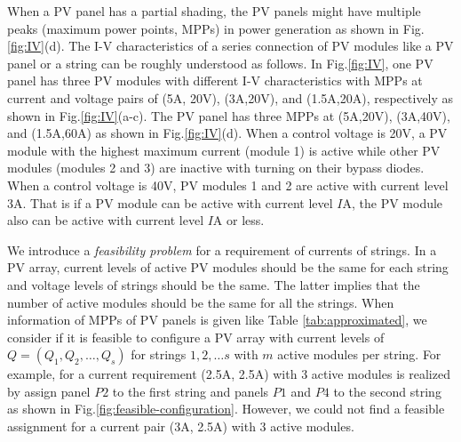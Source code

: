 \documentclass[conference]{IEEEtran}
\begin{document}
When a PV panel has a partial shading, the PV panels might have multiple peaks (maximum power points, MPPs) in power generation as shown in Fig.\ref{fig:IV}(d). 
The I-V characteristics of a series connection of PV modules like a PV panel or a string can be roughly understood as follows. 
In Fig.\ref{fig:IV}, one PV panel has three PV modules with different I-V characteristics with MPPs at current and voltage pairs of (5A, 20V), (3A,20V), and (1.5A,20A), respectively as shown in Fig.\ref{fig:IV}(a-c). The PV panel has three MPPs at (5A,20V), (3A,40V), and (1.5A,60A) as shown in Fig.\ref{fig:IV}(d). 
When a control voltage is 20V, a PV module with the highest maximum current (module 1) is active while other PV modules (modules 2 and 3) are inactive with turning on their bypass diodes. 
When a control voltage is 40V, PV modules 1 and 2 are active with current level 3A. That is if a PV module can be active with current level $I$A, the PV module also can be active with current level $I$A or less.

We introduce a \textit{feasibility problem} for a requirement of currents of strings. 
In a PV array, current levels of active PV modules should be the same for each string and voltage levels of strings should be the same. The latter implies that the number of active modules should be the same for all the strings. 
When information of MPPs of PV panels is given like Table \ref{tab:approximated}, we consider if it is feasible to configure a PV array with current levels of 
$Q = (Q_{1},Q_{2},\ldots ,Q_{s})$ for strings $1,2,\ldots s$ with $m$ active modules per string. For example, for a current requirement (2.5A, 2.5A) with 3 active modules is realized by assign panel $P2$ to the first string and panels $P1$ and $P4$ to the second string as shown in Fig.\ref{fig:feasible-configuration}. However, we could not find a feasible assignment for a current pair (3A, 2.5A) with 3 active modules.


\end{document}
